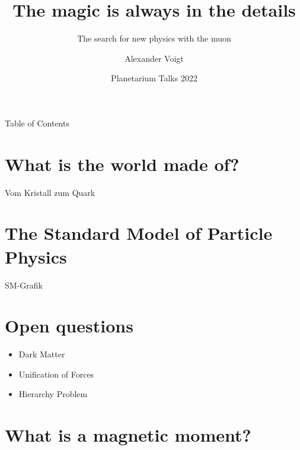 \documentclass[12pt]{beamer}
\title{The magic is always in the details}
\subtitle{The search for new physics with the muon}
\author[Voigt]{Alexander Voigt}
\institute[HS Flensburg]{Hochschule Flensburg}
\date{Planetarium Talks 2022}
\begin{document}

\begin{frame}
  \titlepage
\end{frame}


\begin{frame}{Table of Contents}
  \tableofcontents
\end{frame}


\section{What is the world made of?}

\begin{frame}{\insertsection}
  Vom Kristall zum Quark
\end{frame}


\section{The Standard Model of Particle Physics}

\begin{frame}{\insertsection}
  SM-Grafik
\end{frame}


\section{Open questions}

\begin{frame}{\insertsection}
  \begin{itemize}
  \item Dark Matter
  \item Unification of Forces
  \item Hierarchy Problem
  \end{itemize}
\end{frame}


\section{What is a magnetic moment?}
\end{document}
